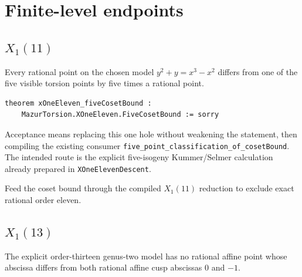 \chapter{Finite-level endpoints}

\section{\(X_1(11)\)}

\begin{theorem}\label{node:MT-X11-COSET}
Every rational point on the chosen model
\(y^2+y=x^3-x^2\) differs from one of the five visible torsion points by five
times a rational point.
\leanpending
\end{theorem}

\begin{verbatim}
theorem xOneEleven_fiveCosetBound :
    MazurTorsion.XOneEleven.FiveCosetBound := sorry
\end{verbatim}

Acceptance means replacing this one hole without weakening the statement,
then compiling the existing consumer
\texttt{five\_point\_classification\_of\_cosetBound}.  The intended route is
the explicit five-isogeny Kummer/Selmer calculation already prepared in
\texttt{XOneElevenDescent}.

\begin{milestone}\label{node:MT-X11-JOIN}
Feed the coset bound through the compiled \(X_1(11)\) reduction to exclude
exact rational order eleven.
\leanpending
\end{milestone}

\section{\(X_1(13)\)}

\begin{theorem}\label{node:MT-X13-NONCUSP}
The explicit order-thirteen genus-two model has no rational affine point
whose abscissa differs from both rational affine cusp abscissas \(0\) and
\(-1\).
\leanpending
\end{theorem}

